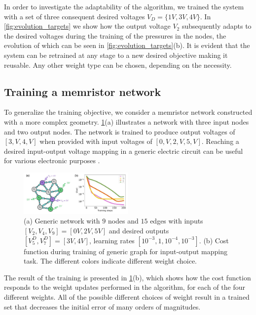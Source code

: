 \documentclass[reprint,superscriptaddress,prb,showkeys]{revtex4-2}
\begin{document}
In order to investigate the adaptability of the algorithm, we trained the system with a set of three consequent desired voltages $V_D=\{1V, 3V, 4V\}$. In \cref{fig:evolution_targets} we show how the output voltage $V_2$ subsequently adapts to the desired voltages during the training of the pressures in the nodes, the evolution of which can be seen in \cref{fig:evolution_targets}(b). It is evident that the system can be retrained at any stage to a new desired objective making it reusable. Any other weight type can be chosen, depending on the necessity.  


\subsection{\label{sec:train_memr_nw}Training a memristor network}

To generalize the training objective, we consider a memristor network constructed with a more complex geometry. \cref{fig:mse_general}(a) illustrates a network with three input nodes and two output nodes. The network is trained to produce output voltages of $[3,V, 4,V]$ when provided with input voltages of $[0,V, 2,V, 5,V]$.  Reaching a desired input-output voltage mapping in a generic electric circuit can be useful for various electronic purposes \cite{voltage_controlled_oscillator, onchip_powerdistributed}. 

\begin{figure}[h]
    \centering
    \includegraphics[width=0.5\textwidth]{plots/general_network/mse_general.pdf}
    \caption{(a) Generic network with $9$ nodes and $15$ edges with inputs $[V_{2}, V_{4}, V_{9}] = [0V, 2V, 5V]$ and desired outputs $[V_{5}^D, V_{7}^D] = [3V, 4V]$, learning rates $[10^{-3}, 1, 10^{-4}, 10^{-3}]$. (b) Cost function during training of generic graph for input-output mapping task. The different colors indicate different weight choice.}\label{fig:mse_general}
\end{figure} 

The result of the training is presented in \cref{fig:mse_general}(b), which shows how the cost function responds to the weight updates performed in the algorithm, for each of the four different weights. All of the possible different choices of weight result in a trained set that decreases the initial error of many orders of magnitudes. 
\end{document}
